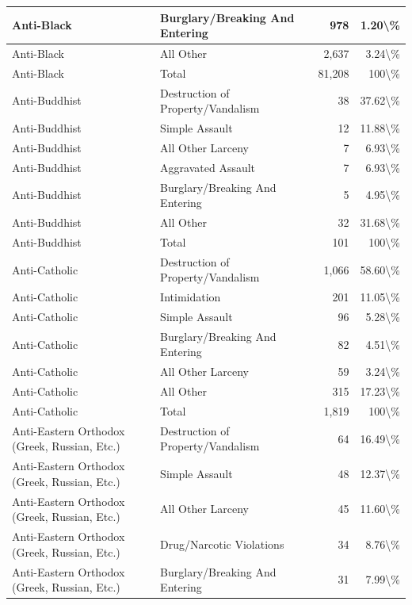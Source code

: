 \documentclass[
]{krantz}
\begin{document}
\begin{longtable}[t]{l|l|r|r}
\hline
Anti-Black & Burglary/Breaking And Entering & 978 & 1.20\textbackslash{}\%\\
\hline
Anti-Black & All Other & 2,637 & 3.24\textbackslash{}\%\\
\hline
Anti-Black & Total & 81,208 & 100\textbackslash{}\%\\
\hline
Anti-Buddhist & Destruction of Property/Vandalism & 38 & 37.62\textbackslash{}\%\\
\hline
Anti-Buddhist & Simple Assault & 12 & 11.88\textbackslash{}\%\\
\hline
Anti-Buddhist & All Other Larceny & 7 & 6.93\textbackslash{}\%\\
\hline
Anti-Buddhist & Aggravated Assault & 7 & 6.93\textbackslash{}\%\\
\hline
Anti-Buddhist & Burglary/Breaking And Entering & 5 & 4.95\textbackslash{}\%\\
\hline
Anti-Buddhist & All Other & 32 & 31.68\textbackslash{}\%\\
\hline
Anti-Buddhist & Total & 101 & 100\textbackslash{}\%\\
\hline
Anti-Catholic & Destruction of Property/Vandalism & 1,066 & 58.60\textbackslash{}\%\\
\hline
Anti-Catholic & Intimidation & 201 & 11.05\textbackslash{}\%\\
\hline
Anti-Catholic & Simple Assault & 96 & 5.28\textbackslash{}\%\\
\hline
Anti-Catholic & Burglary/Breaking And Entering & 82 & 4.51\textbackslash{}\%\\
\hline
Anti-Catholic & All Other Larceny & 59 & 3.24\textbackslash{}\%\\
\hline
Anti-Catholic & All Other & 315 & 17.23\textbackslash{}\%\\
\hline
Anti-Catholic & Total & 1,819 & 100\textbackslash{}\%\\
\hline
Anti-Eastern Orthodox (Greek, Russian, Etc.) & Destruction of Property/Vandalism & 64 & 16.49\textbackslash{}\%\\
\hline
Anti-Eastern Orthodox (Greek, Russian, Etc.) & Simple Assault & 48 & 12.37\textbackslash{}\%\\
\hline
Anti-Eastern Orthodox (Greek, Russian, Etc.) & All Other Larceny & 45 & 11.60\textbackslash{}\%\\
\hline
Anti-Eastern Orthodox (Greek, Russian, Etc.) & Drug/Narcotic Violations & 34 & 8.76\textbackslash{}\%\\
\hline
Anti-Eastern Orthodox (Greek, Russian, Etc.) & Burglary/Breaking And Entering & 31 & 7.99\textbackslash{}\%\\

\end{longtable}
\end{document}
